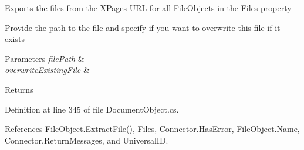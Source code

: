 Exports the files from the X\+Pages U\+RL for all File\+Objects in the Files property 

Provide the path to the file and specify if you want to overwrite this file if it exists


\begin{DoxyParams}{Parameters}
{\em file\+Path} & \\
\hline
{\em overwrite\+Existing\+File} & \\
\hline
\end{DoxyParams}
\begin{DoxyReturn}{Returns}

\end{DoxyReturn}


Definition at line 345 of file Document\+Object.\+cs.



References File\+Object.\+Extract\+File(), Files, Connector.\+Has\+Error, File\+Object.\+Name, Connector.\+Return\+Messages, and Universal\+ID.


